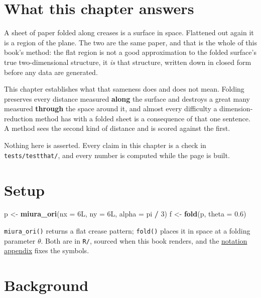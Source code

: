 \documentclass[
  british,
  a4paper,
]{book}
\newenvironment{Shaded}{\begin{snugshade}}{\end{snugshade}}
\newcommand{\AttributeTok}[1]{\textcolor[rgb]{0.13,0.29,0.53}{#1}}
\newcommand{\DataTypeTok}[1]{\textcolor[rgb]{0.13,0.29,0.53}{#1}}
\newcommand{\DecValTok}[1]{\textcolor[rgb]{0.00,0.00,0.81}{#1}}
\newcommand{\FloatTok}[1]{\textcolor[rgb]{0.00,0.00,0.81}{#1}}
\newcommand{\FunctionTok}[1]{\textcolor[rgb]{0.13,0.29,0.53}{\textbf{#1}}}
\newcommand{\NormalTok}[1]{#1}
\newcommand{\OtherTok}[1]{\textcolor[rgb]{0.56,0.35,0.01}{#1}}
\newcommand{\SpecialCharTok}[1]{\textcolor[rgb]{0.81,0.36,0.00}{\textbf{#1}}}
\begin{document}
\section{What this chapter answers}\label{geom-question}

A sheet of paper folded along creases is a surface in space. Flattened out again
it is a region of the plane. The two are the same paper, and that is the whole
of this book's method: the flat region is not a good approximation to the folded
surface's true two-dimensional structure, it \emph{is} that structure, written down
in closed form before any data are generated.

This chapter establishes what that sameness does and does not mean. Folding
preserves every distance measured \textbf{along} the surface and destroys a great
many measured \textbf{through} the space around it, and almost every difficulty a
dimension-reduction method has with a folded sheet is a consequence of that one
sentence. A method sees the second kind of distance and is scored against the
first.

Nothing here is asserted. Every claim in this chapter is a check in
\texttt{tests/testthat/}, and every number is computed while the page is built.

\section{Setup}\label{geom-setup}

\begin{Shaded}
\begin{Highlighting}[]
\NormalTok{p }\OtherTok{\textless{}{-}} \FunctionTok{miura\_ori}\NormalTok{(}\AttributeTok{nx =} \DecValTok{6}\DataTypeTok{L}\NormalTok{, }\AttributeTok{ny =} \DecValTok{6}\DataTypeTok{L}\NormalTok{, }\AttributeTok{alpha =}\NormalTok{ pi }\SpecialCharTok{/} \DecValTok{3}\NormalTok{)}
\NormalTok{f }\OtherTok{\textless{}{-}} \FunctionTok{fold}\NormalTok{(p, }\AttributeTok{theta =} \FloatTok{0.6}\NormalTok{)}
\end{Highlighting}
\end{Shaded}

\texttt{miura\_ori()} returns a flat crease pattern; \texttt{fold()} places it in space at a
folding parameter \(\theta\). Both are in \texttt{R/}, sourced when this book renders,
and the \hyperref[notation]{notation appendix} fixes the symbols.

\section{Background}\label{geom-background}
\end{document}
